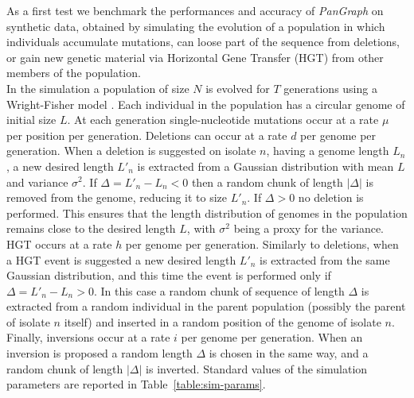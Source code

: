 \documentclass[aps,rmp,reprint,superscriptaddress,notitlepage,10pt,onecolumn]{revtex4-1}
\begin{document}
As a first test we benchmark the performances and accuracy of \textit{PanGraph} on synthetic data, obtained by simulating the evolution of a population in which individuals accumulate mutations, can loose part of the sequence from deletions, or gain new genetic material via Horizontal Gene Transfer (HGT) from other members of the population.\\
In the simulation a population of size $N$ is evolved for $T$ generations using a Wright-Fisher model \cite{hudson2002generating}. Each individual in the population has a circular genome of initial size $L$. At each generation single-nucleotide mutations occur at a rate $\mu$ per position per generation. Deletions can occur at a rate $d$ per genome per generation. When a deletion is suggested on isolate $n$, having a genome length $L_n$, a new desired length $L'_n$ is extracted from a Gaussian distribution with mean $L$ and variance $\sigma^2$. If $\Delta = L'_n - L_n < 0$ then a random chunk of length $|\Delta|$ is removed from the genome, reducing it to size $L'_n$. If $\Delta > 0$ no deletion is performed. This ensures that the length distribution of genomes in the population remains close to the desired length $L$, with $\sigma^2$ being a proxy for the variance.
HGT occurs at a rate $h$ per genome per generation. Similarly to deletions, when a HGT event is suggested a new desired length $L'_n$ is extracted from the same Gaussian distribution, and this time the event is performed only if $\Delta = L'_n - L_n > 0$. In this case a random chunk of sequence of length $\Delta$ is extracted from a random individual in the parent population (possibly the parent of isolate $n$ itself) and inserted in a random position of the genome of isolate $n$.
Finally, inversions occur at a rate $i$ per genome per generation. When an inversion is proposed a random length $\Delta$ is chosen in the same way, and a random chunk of length $|\Delta|$ is inverted.
Standard values of the simulation parameters are reported in Table~\ref{table:sim-params}.
\end{document}
